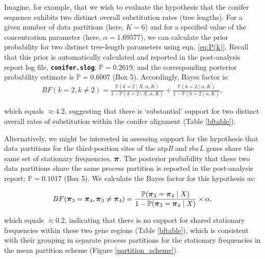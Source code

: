 \documentclass[11pt]{article}
\newcommand{\cl}[1]{{\texttt{\textbf{#1}}}}
\begin{document}
Imagine, for example, that we wish to evaluate the hypothesis that the conifer sequence exhibits two distinct overall substitution rates (tree lengths).
For a given number of data partitions (here, $K =6$) and for a specified value of the concentration parameter (here, $\alpha = 1.69577$), we can calculate the prior probability for two distinct tree-length parameters using eqn. \ref{eq:P(k)}.
Recall that this prior is automatically calculated and reported in the post-analysis report log file, \cl{conifer.slog}; $\mathbb{P} = 0.2619$, and the corresponding posterior probability estimate is $\mathbb{P} = 0.6007$ (Box 5).
Accordingly, Bayes factor is:
 \begin{align*}
BF(k = 2,k \neq 2) = \frac{\mathbb{P}(k=2\mid X, \alpha, K)}{1-\mathbb{P}(k=2\mid X, \alpha, K)} \div \frac{\mathbb{P}(k=2\mid \alpha, K)}{1-\mathbb{P}(k=2\mid \alpha, K)},
\end{align*}

which equals $\approx 4.2$, suggesting that there is `substantial' support for two distinct overall rates of substitution within the conifer alignment (Table \ref{bftable}).

Alternatively, we might be interested in assessing support for the hypothesis that data partitions for the third-position sites of the atp\emph{B} and rbc\emph{L} genes share the same set of stationary frequencies, $\mbox{\boldmath$\pi$\unboldmath}$.
The posterior probability that these two data partitions share the same process partition is reported in the post-analysis report; $\mathbb{P} = 0.1017$ (Box 5).
We calculate the Bayes factor for this hypothesis as:

 \begin{align*}
BF(\mbox{\boldmath$\pi$\unboldmath}_3 = \mbox{\boldmath$\pi$\unboldmath}_4, \mbox{\boldmath$\pi$\unboldmath}_3 \neq \mbox{\boldmath$\pi$\unboldmath}_4) = \frac{\mathbb{P}(\mbox{\boldmath$\pi$\unboldmath}_3 = \mbox{\boldmath$\pi$\unboldmath}_4 \mid X)}{1 - \mathbb{P}(\mbox{\boldmath$\pi$\unboldmath}_3 = \mbox{\boldmath$\pi$\unboldmath}_4 \mid X)} \times \alpha,
\end{align*}

which equals $\approx 0.2$, indicating that there is no support for shared stationary frequencies within these two gene regions (Table \ref{bftable}), which is consistent with their grouping in separate process partitions for the stationary frequencies in the mean partition scheme (Figure \ref{partition_scheme}). 

\bigskip
\end{document}
